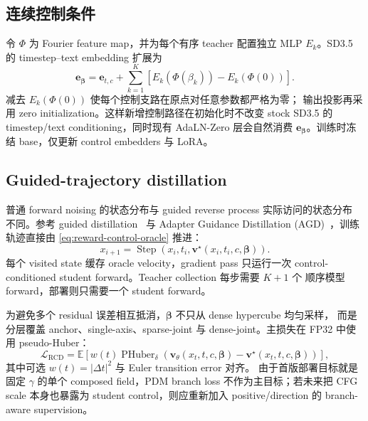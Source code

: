 \documentclass[11pt,a4paper]{article}
\newcommand{\E}{\mathbb{E}}
\newcommand{\vfield}{\bm{v}}
\theoremstyle{definition}
\theoremstyle{plain}
\begin{document}
\subsection{连续控制条件}

令 $\Phi$ 为 Fourier feature map，并为每个有序 teacher 配置独立 MLP
$E_k$。SD3.5 的 timestep--text embedding 扩展为
\begin{equation}
  \bm e_{\bm\beta}
  =
  \bm e_{t,c}
  +
  \sum_{k=1}^{K}
  \left[
    E_k(\Phi(\beta_k))-E_k(\Phi(0))
  \right].
  \label{eq:reward-control-temb}
\end{equation}
减去 $E_k(\Phi(0))$ 使每个控制支路在原点对任意参数都严格为零；
输出投影再采用 zero initialization。这样新增控制路径在初始化时不改变 stock
SD3.5 的 timestep/text conditioning，同时现有 AdaLN-Zero 层会自然消费
$\bm e_{\bm\beta}$。训练时冻结 base，仅更新 control embedders 与 LoRA。

\subsection{Guided-trajectory distillation}

普通 forward noising 的状态分布与 guided reverse process 实际访问的状态分布
不同。参考 guided distillation~\cite{guideddistill} 与
Adapter Guidance Distillation (AGD)~\cite{agd}，训练轨迹直接由
\eqref{eq:reward-control-oracle} 推进：
\begin{equation}
  x_{i+1}
  =
  \operatorname{Step}
  \left(x_i,t_i,\vfield^\star(x_i,t_i,c,\bm\beta)\right).
  \label{eq:reward-control-rollout}
\end{equation}
每个 visited state 缓存 oracle velocity，gradient pass 只运行一次
control-conditioned student forward。Teacher collection 每步需要 $K+1$ 个
顺序模型 forward，部署则只需要一个 student forward。

为避免多个 residual 误差相互抵消，$\bm\beta$ 不只从 dense hypercube 均匀采样，
而是分层覆盖 anchor、single-axis、sparse-joint 与 dense-joint。主损失在
FP32 中使用 pseudo-Huber：
\begin{equation}
  \mathcal L_{\mathrm{RCD}}
  =
  \E\left[
    w(t)
    \operatorname{PHuber}_{\delta}
    \left(
      \vfield_{\theta}(x_t,t,c,\bm\beta)
      -
      \vfield^\star(x_t,t,c,\bm\beta)
    \right)
  \right],
  \label{eq:reward-control-loss}
\end{equation}
其中可选 $w(t)=|\Delta t|^2$ 与 Euler transition error 对齐。
由于首版部署目标就是固定 $\gamma$ 的单个 composed field，PDM branch loss
不作为主目标；若未来把 CFG scale 本身也暴露为 student control，则应重新加入
positive/direction 的 branch-aware supervision。
\end{document}
